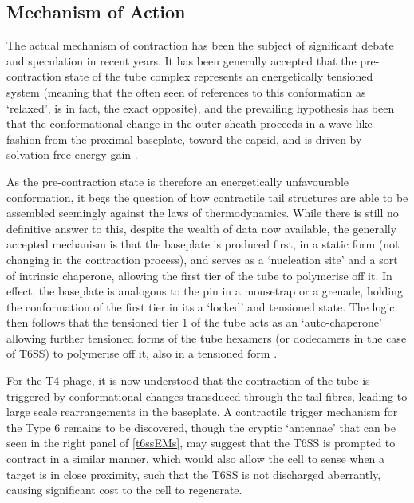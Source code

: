 \subsection{Mechanism of Action}\label{mechanismofaction}
The actual mechanism of contraction has been the subject of significant debate and speculation in recent years. It has been generally accepted that the pre-contraction state of the tube complex represents an energetically tensioned system (meaning that the often seen of references to this conformation as `relaxed', is in fact, the exact opposite), and the prevailing hypothesis has been that the conformational change in the outer sheath proceeds in a wave-like fashion from the proximal baseplate, toward the capsid, and is driven by solvation free energy gain \citep{Brackmann2017, Kube2015a, Kube2014, Moody1973}. 

As the pre-contraction state is therefore an energetically unfavourable conformation, it begs the question of how contractile tail structures are able to be assembled seemingly against the laws of thermodynamics. While there is still no definitive answer to this, despite the wealth of data now available, the generally accepted mechanism is that the baseplate is produced first, in a static form (not changing in the contraction process), and serves as a `nucleation site' and a sort of intrinsic chaperone, allowing the first tier of the tube to polymerise off it. In effect, the baseplate is analogous to the pin in a mousetrap or a grenade, holding the conformation of the first tier in its a `locked' and tensioned state. The logic then follows that the tensioned tier 1 of the tube acts as an `auto-chaperone' allowing further tensioned forms of the tube hexamers (or dodecamers in the case of T6SS) to polymerise off it, also in a tensioned form \citep{Kube2015}.

For the T4 phage, it is now understood that the contraction of the tube is triggered by conformational changes transduced through the tail fibres, leading to large scale rearrangements in the baseplate. A contractile trigger mechanism for the Type 6 remains to be discovered, though the cryptic `antennae' that can be seen in the right panel of \vref{t6ssEMs}, may suggest that the T6SS is prompted to contract in a similar manner, which would also allow the cell to sense when a target is in close proximity, such that the T6SS is not discharged aberrantly, causing significant cost to the cell to regenerate. 

